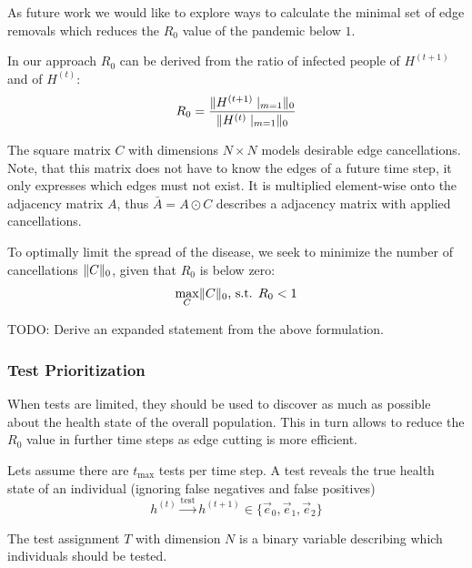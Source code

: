\documentclass[]{article}
\DeclarePairedDelimiter\norm{\lVert}{\rVert}%
\begin{document}
As future work we would like to explore ways to calculate the minimal set of edge removals which reduces the $R_0$ value of the pandemic below $1$.

In our approach $R_0$ can be derived from the ratio of infected people of $H^{(t+1)}$ and of $H^{(t)}$:
\begin{equation}
	R_0 = \frac{\norm{H^{(t+1)}\mid_{m=1}}_{0}}{\norm{H^{(t)}\mid_{m=1}}_{0}} %
\end{equation}

The square matrix $C$ with dimensions $N \times N$ models desirable edge cancellations.
Note, that this matrix does not have to know the edges of a future time step, it only expresses which edges must not exist.
It is multiplied element-wise onto the adjacency matrix $A$, thus $\bar{A} = A \odot C$ describes a adjacency matrix with applied cancellations.

To optimally limit the spread of the disease, we seek to minimize the number of cancellations $\norm{C}_0$, given that $R_0$ is below zero:
\begin{equation}
	\max_{C} \norm{C}_0\text{, s.t. }R_0 < 1
\end{equation}

TODO: Derive an expanded statement from the above formulation.\\

\subsubsection{Test Prioritization}
When tests are limited, they should be used to discover as much as possible about the health state of the overall population.
This in turn allows to reduce the $R_0$ value in further time steps as edge cutting is more efficient.

Lets assume there are $t_{\text{max}}$ tests per time step.
A test reveals the true health state of an individual (ignoring false negatives and false positives)
\begin{equation}
	h^{(t)} \xrightarrow{\text{test}} h^{(t+1)} \in \{\vec{e}_0, \vec{e}_1, \vec{e}_2 \}
\end{equation}

The test assignment $T$ with dimension $N$ is a binary variable describing which individuals should be tested.
\end{document}

